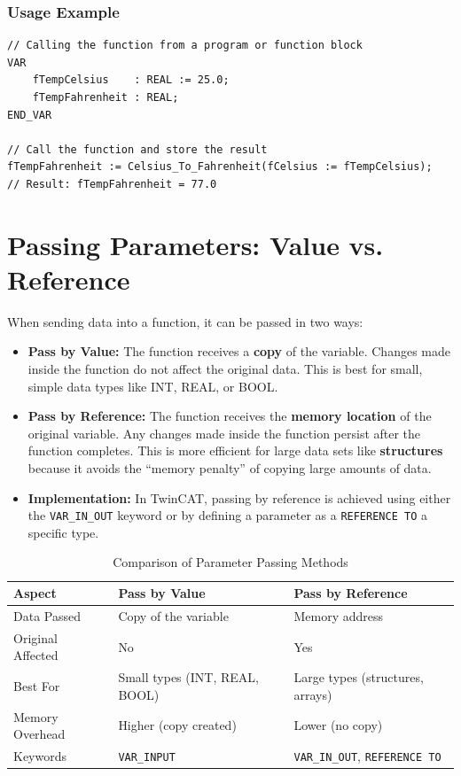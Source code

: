\documentclass[11pt,a4paper]{article}
\begin{document}
\subsubsection*{Usage Example}

\begin{lstlisting}
// Calling the function from a program or function block
VAR
    fTempCelsius    : REAL := 25.0;
    fTempFahrenheit : REAL;
END_VAR

// Call the function and store the result
fTempFahrenheit := Celsius_To_Fahrenheit(fCelsius := fTempCelsius);
// Result: fTempFahrenheit = 77.0
\end{lstlisting}

\section{Passing Parameters: Value vs. Reference}

When sending data into a function, it can be passed in two ways:

\begin{itemize}[leftmargin=*]
    \item \textbf{Pass by Value:} The function receives a \textbf{copy} of the variable. Changes made inside the function do not affect the original data. This is best for small, simple data types like INT, REAL, or BOOL.
    
    \item \textbf{Pass by Reference:} The function receives the \textbf{memory location} of the original variable. Any changes made inside the function persist after the function completes. This is more efficient for large data sets like \textbf{structures} because it avoids the ``memory penalty'' of copying large amounts of data.
    
    \item \textbf{Implementation:} In TwinCAT, passing by reference is achieved using either the \texttt{VAR\_IN\_OUT} keyword or by defining a parameter as a \texttt{REFERENCE TO} a specific type.
\end{itemize}

\begin{table}[h]
\centering
\begin{tabular}{@{}lll@{}}
\toprule
\textbf{Aspect} & \textbf{Pass by Value} & \textbf{Pass by Reference} \\
\midrule
Data Passed & Copy of the variable & Memory address \\
Original Affected & No & Yes \\
Best For & Small types (INT, REAL, BOOL) & Large types (structures, arrays) \\
Memory Overhead & Higher (copy created) & Lower (no copy) \\
Keywords & \texttt{VAR\_INPUT} & \texttt{VAR\_IN\_OUT}, \texttt{REFERENCE TO} \\
\bottomrule
\end{tabular}
\caption{Comparison of Parameter Passing Methods}
\end{table}
\end{document}
